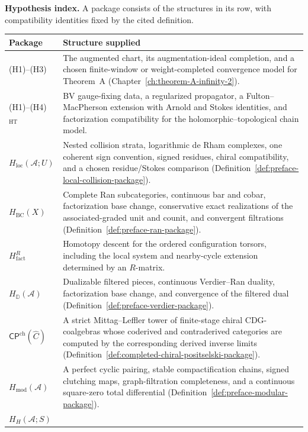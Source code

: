 \documentclass[11pt]{memoir}
\newcommand{\cA}{\mathcal{A}}
\begin{document}
\smallskip
\noindent\textbf{Hypothesis index.}
A package consists of the structures in its row, with compatibility
identities fixed by the cited definition.
\begin{center}
\small
\renewcommand{\arraystretch}{1.18}
\begin{tabular}{@{}p{}p{}@{}}
\toprule
\textbf{Package} & \textbf{Structure supplied}\\
\midrule
\textup{(H1)--(H3)} &
The augmented chart, its augmentation-ideal completion, and a chosen
finite-window or weight-completed convergence model for Theorem~A
(Chapter~\ref{ch:theorem-A-infinity-2}).\\
\textup{(H1)--(H4)}$_{\mathrm{HT}}$ &
BV gauge-fixing data, a regularized propagator, a
Fulton--MacPherson extension with Arnold and Stokes identities, and
factorization compatibility for the holomorphic--topological chain
model.\\
$H_{\mathrm{loc}}(\cA;U)$ &
Nested collision strata, logarithmic de Rham complexes, one coherent
sign convention, signed residues, chiral compatibility, and a chosen
residue/Stokes comparison
(Definition~\ref{def:preface-local-collision-package}).\\
$H_{\mathrm{BC}}(X)$ &
Complete Ran subcategories, continuous bar and cobar, factorization
base change, conservative exact realizations of the associated-graded
unit and counit, and convergent filtrations
(Definition~\ref{def:preface-ran-package}).\\
$H_{\mathrm{fact}}^R$ &
Homotopy descent for the ordered configuration torsors, including the
local system and nearby-cycle extension determined by an
$R$-matrix.\\
$H_{\mathbb D}(\cA)$ &
Dualizable filtered pieces, continuous Verdier--Ran duality,
factorization base change, and convergence of the filtered dual
(Definition~\ref{def:preface-verdier-package}).\\
$\mathsf{CP}^{\mathrm{ch}}(\widehat C)$ &
A strict Mittag--Leffler tower of finite-stage chiral CDG-coalgebras
whose coderived and contraderived categories are computed by the
corresponding derived inverse limits
(Definition~\ref{def:completed-chiral-positselski-package}).\\
$H_{\mathrm{mod}}(\cA)$ &
A perfect cyclic pairing, stable compactification chains, signed
clutching maps, graph-filtration completeness, and a continuous
square-zero total differential
(Definition~\ref{def:preface-modular-package}).\\
$H_H(\cA;S)$ &

\end{tabular}
\end{center}
\end{document}
